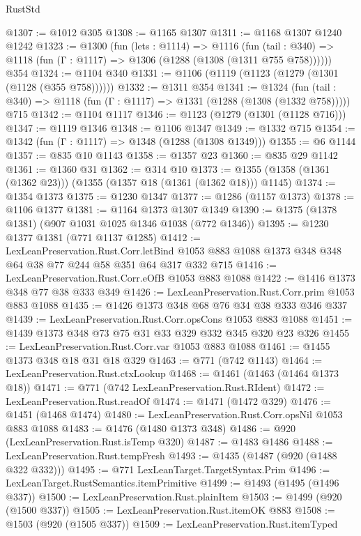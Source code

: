 \begin{lexlean}{RustStd}
\begin{coremodule}
@1307 := @1012 @305
@1308 := @1165 @1307
@1311 := @1168 @1307 @1240 @1242
@1323 := @1300
    (fun (lets : @1114) =>
    @1116 (fun (tail : @340) => @1118 (fun (Γ : @1117) => @1306 (@1288 (@1308 (@1311 @755 @758))))))
    @354
@1324 := @1104 @340
@1331 := @1106 (@1119 (@1123 (@1279 (@1301 (@1128 (@355 @758))))))
@1332 := @1311 @354
@1341 := @1324
    (fun (tail : @340) => @1118 (fun (Γ : @1117) => @1331 (@1288 (@1308 (@1332 @758)))))
    @715
@1342 := @1104 @1117
@1346 := @1123 (@1279 (@1301 (@1128 @716)))
@1347 := @1119 @1346
@1348 := @1106 @1347
@1349 := @1332 @715
@1354 := @1342 (fun (Γ : @1117) => @1348 (@1288 (@1308 @1349)))
@1355 := @6 @1144
@1357 := @835 @10 @1143
@1358 := @1357 @23
@1360 := @835 @29 @1142
@1361 := @1360 @31
@1362 := @314 @10
@1373 := @1355 (@1358 (@1361 (@1362 @23))) (@1355 (@1357 @18 (@1361 (@1362 @18))) @1145)
@1374 := @1354 @1373
@1375 := @1230 @1347
@1377 := @1286 (@1157 @1373)
@1378 := @1106 @1377
@1381 := @1164 @1373 @1307 @1349
@1390 := @1375 (@1378 @1381) (@907 @1031 @1025 @1346 @1038 (@772 @1346))
@1395 := @1230 @1377 @1381 (@771 @1137 @1285)
@1412 := LexLeanPreservation.Rust.Corr.letBind
    @1053
    @883
    @1088
    @1373
    @348
    @348
    @64
    @38
    @77
    @244
    @58
    @351
    @64
    @317
    @332
    @715
@1416 := LexLeanPreservation.Rust.Corr.eOfB @1053 @883 @1088
@1422 := @1416 @1373 @348 @77 @38 @333 @349
@1426 := LexLeanPreservation.Rust.Corr.prim @1053 @883 @1088
@1435 := @1426 @1373 @348 @68 @76 @34 @38 @333 @346 @337
@1439 := LexLeanPreservation.Rust.Corr.opsCons @1053 @883 @1088
@1451 := @1439 @1373 @348 @73 @75 @31 @33 @329 @332 @345 @320 @23 @326
@1455 := LexLeanPreservation.Rust.Corr.var @1053 @883 @1088
@1461 := @1455 @1373 @348 @18 @31 @18 @329
@1463 := @771 (@742 @1143)
@1464 := LexLeanPreservation.Rust.ctxLookup
@1468 := @1461 (@1463 (@1464 @1373 @18))
@1471 := @771 (@742 LexLeanPreservation.Rust.RIdent)
@1472 := LexLeanPreservation.Rust.readOf
@1474 := @1471 (@1472 @329)
@1476 := @1451 (@1468 @1474)
@1480 := LexLeanPreservation.Rust.Corr.opsNil @1053 @883 @1088
@1483 := @1476 (@1480 @1373 @348)
@1486 := @920 (LexLeanPreservation.Rust.isTemp @320)
@1487 := @1483 @1486
@1488 := LexLeanPreservation.Rust.tempFresh
@1493 := @1435 (@1487 (@920 (@1488 @322 @332)))
@1495 := @771 LexLeanTarget.TargetSyntax.Prim
@1496 := LexLeanTarget.RustSemantics.itemPrimitive
@1499 := @1493 (@1495 (@1496 @337))
@1500 := LexLeanPreservation.Rust.plainItem
@1503 := @1499 (@920 (@1500 @337))
@1505 := LexLeanPreservation.Rust.itemOK @883
@1508 := @1503 (@920 (@1505 @337))
@1509 := LexLeanPreservation.Rust.itemTyped

\end{coremodule}
\end{lexlean}
